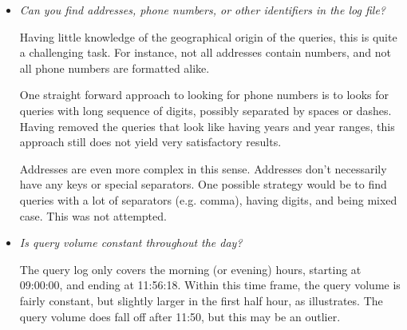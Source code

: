 \begin{itemize}
\item \emph{Can you find addresses, phone numbers, or other identifiers in the
log file?}

Having little knowledge of the geographical origin of the queries, this is
quite a challenging task. For instance, not all addresses contain numbers, and
not all phone numbers are formatted alike.

One straight forward approach to looking for phone numbers is to looks for
queries with long sequence of digits, possibly separated by spaces or dashes.
Having removed the queries that look like having years and year ranges, this
approach still does not yield very satisfactory results.

Addresses are even more complex in this sense. Addresses don't necessarily have
any keys or special separators. One possible strategy would be to find queries
with a lot of separators (e.g. comma), having digits, and being mixed case.
This was not attempted.

\item \emph{Is query volume constant throughout the day?}

The query log only covers the morning (or evening) hours, starting at 09:00:00,
and ending at 11:56:18. Within this time frame, the query volume is fairly
constant, but slightly larger in the first half hour, as 
illustrates. The query volume does fall off after 11:50\footnotemark, but this
may be an outlier.



\end{itemize}

